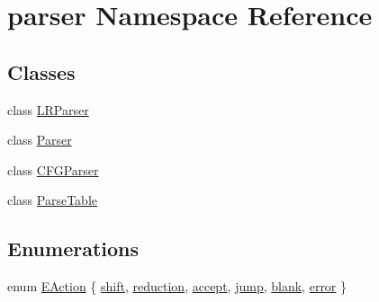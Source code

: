 \hypertarget{namespaceparser}{\section{parser \-Namespace \-Reference}
\label{d0/dd5/namespaceparser}
}
\subsection*{\-Classes}
\begin{DoxyCompactItemize}
\item 
class \hyperlink{classparser_1_1LRParser}{\-L\-R\-Parser}
\item 
class \hyperlink{classparser_1_1Parser}{\-Parser}
\item 
class \hyperlink{classparser_1_1CFGParser}{\-C\-F\-G\-Parser}
\item 
class \hyperlink{classparser_1_1ParseTable}{\-Parse\-Table}
\end{DoxyCompactItemize}
\subsection*{\-Enumerations}
\begin{DoxyCompactItemize}
\item 
enum \hyperlink{namespaceparser_a7a838229f5b5b20f185dfad9d362dbed}{\-E\-Action} \{ \*
\hyperlink{namespaceparser_a7a838229f5b5b20f185dfad9d362dbedaa0b431997906e4d0c453d7ba0fe1c744}{shift}, 
\hyperlink{namespaceparser_a7a838229f5b5b20f185dfad9d362dbeda175b62b0686c65910f72c0c4b7ff2c86}{reduction}, 
\hyperlink{namespaceparser_a7a838229f5b5b20f185dfad9d362dbedab009f2af27ebdb5b6829ee1614826576}{accept}, 
\hyperlink{namespaceparser_a7a838229f5b5b20f185dfad9d362dbedacce7c4f977d7145f234fd8f2691dab61}{jump}, 
\*
\hyperlink{namespaceparser_a7a838229f5b5b20f185dfad9d362dbeda0c4197e3086acf7d33bcf1a943d4754c}{blank}, 
\hyperlink{namespaceparser_a7a838229f5b5b20f185dfad9d362dbedaa02231033cc9e46e39eff451b2aeafb9}{error}
 \}
\end{DoxyCompactItemize}


